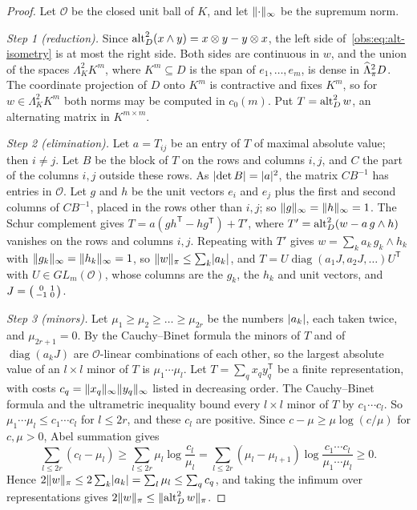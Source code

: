 \begin{proof}
Let $\mathcal O$ be the closed unit ball of $K$, and let $\lVert \cdot\rVert_\infty$ be the supremum norm.

\emph{Step 1 (reduction).} Since $\operatorname{alt}^2_D(x\wedge y)=x\otimes y-y\otimes x$, the left side
of~\eqref{obs:eq:alt-isometry} is at most the right side. Both sides are continuous in $w$, and the union of the spaces
$\Lambda^2_KK^m$, where $K^m\subseteq D$ is the span of $e_1,\dots,e_m$, is dense in $\widehat\Lambda^2_\pi D$. The coordinate
projection of $D$ onto $K^m$ is contractive and fixes $K^m$, so for $w\in\Lambda^2_KK^m$ both norms may be computed in
$c_0(m)$. Put $T=\operatorname{alt}^2_Dw$, an alternating matrix in $K^{m\times m}$.

\emph{Step 2 (elimination).} Let $a=T_{ij}$ be an entry of $T$ of maximal absolute value; then $i\ne j$. Let $B$ be the
block of $T$ on the rows and columns $i,j$, and $C$ the part of the columns $i,j$ outside these rows. As
$\lvert \det B\rvert=\lvert a\rvert^2$, the matrix $CB^{-1}$ has entries in $\mathcal O$. Let $g$ and $h$ be the unit vectors $e_i$
and $e_j$ plus the first and second columns of $CB^{-1}$, placed in the rows other than $i,j$; so
$\lVert g\rVert_\infty=\lVert h\rVert_\infty=1$. The Schur complement gives $T=a(gh^{\mathsf T}-hg^{\mathsf T})+T'$, where
$T'=\operatorname{alt}^2_D(w-a\,g\wedge h)$ vanishes on the rows and columns $i,j$. Repeating with $T'$ gives
$w=\sum_ka_k\,g_k\wedge h_k$ with $\lVert g_k\rVert_\infty=\lVert h_k\rVert_\infty=1$, so $\lVert w\rVert_\pi\le\sum_k\lvert a_k\rvert$, and
$T=U\operatorname{diag}(a_1J,a_2J,\dots)U^{\mathsf T}$ with $U\in GL_m(\mathcal O)$, whose columns are the
$g_k$, the $h_k$ and unit vectors, and $J=\begin{psmallmatrix}0&1\\-1&0\end{psmallmatrix}$.

\emph{Step 3 (minors).} Let $\mu_1\ge\mu_2\ge\dots\ge\mu_{2r}$ be the numbers $\lvert a_k\rvert$, each taken twice, and
$\mu_{2r+1}=0$. By the Cauchy--Binet formula the minors of $T$ and of $\operatorname{diag}(a_kJ)$ are
$\mathcal O$-linear combinations of each other, so the largest absolute value of an $l\times l$ minor of $T$ is
$\mu_1\cdots\mu_l$. Let $T=\sum_qx_qy_q^{\mathsf T}$ be a finite representation, with costs
$c_q=\lVert x_q\rVert_\infty\lVert y_q\rVert_\infty$ listed in decreasing order. The Cauchy--Binet formula and the ultrametric
inequality bound every $l\times l$ minor of $T$ by $c_1\cdots c_l$. So $\mu_1\cdots\mu_l\le c_1\cdots c_l$ for
$l\le2r$, and these $c_l$ are positive. Since $c-\mu\ge\mu\log(c/\mu)$ for $c,\mu>0$, Abel summation gives
\[
 \sum_{l\le2r}(c_l-\mu_l)\ge\sum_{l\le2r}\mu_l\log\frac{c_l}{\mu_l}
 =\sum_{l\le2r}(\mu_l-\mu_{l+1})\log\frac{c_1\cdots c_l}{\mu_1\cdots\mu_l}\ge0 .
\]
Hence $2\lVert w\rVert_\pi\le2\sum_k\lvert a_k\rvert=\sum_l\mu_l\le\sum_qc_q$, and taking the infimum over representations gives
$2\lVert w\rVert_\pi\le\lVert \operatorname{alt}^2_Dw\rVert_\pi$.
\end{proof}
